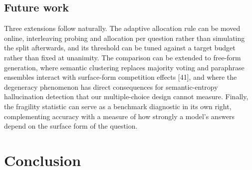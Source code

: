 \documentclass[preprint,12pt]{elsarticle}
\begin{document}
\subsection{Future work}

Three extensions follow naturally. The adaptive allocation rule can be moved online, interleaving probing and allocation per question rather than simulating the split afterwards, and its threshold can be tuned against a target budget rather than fixed at unanimity. The comparison can be extended to free-form generation, where semantic clustering replaces majority voting and paraphrase ensembles interact with surface-form competition effects [41], and where the degeneracy phenomenon has direct consequences for semantic-entropy hallucination detection that our multiple-choice design cannot measure. Finally, the fragility statistic can serve as a benchmark diagnostic in its own right, complementing accuracy with a measure of how strongly a model's answers depend on the surface form of the question.

\section{Conclusion}
\end{document}
